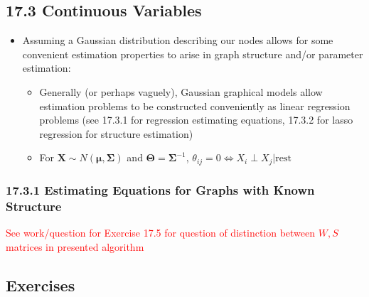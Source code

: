 \documentclass[11pt]{article}
\begin{document}
\subsection*{17.3 Continuous Variables}

\begin{itemize}
    \item Assuming a Gaussian distribution describing our nodes allows for some convenient estimation properties to arise in graph structure and/or parameter estimation:
    \begin{itemize}
        \item Generally (or perhaps vaguely), Gaussian graphical models allow estimation problems to be constructed conveniently as linear regression problems (see 17.3.1 for regression estimating equations, 17.3.2 for lasso regression for structure estimation)
        \item For $\mathbf{X} \sim N(\boldsymbol{\mu}, \boldsymbol\Sigma)$ and $\boldsymbol\Theta = \boldsymbol\Sigma^{-1}$, $\theta_{ij}=0 \Leftrightarrow X_i \perp X_j | \text{rest}$
    \end{itemize}
\end{itemize}

\subsubsection{17.3.1 Estimating Equations for Graphs with Known Structure}

\textcolor{red}{See work/question for Exercise 17.5 for question of distinction between $W, S$ matrices in presented algorithm}

\newpage 

\subsection*{Exercises}
\end{document}
